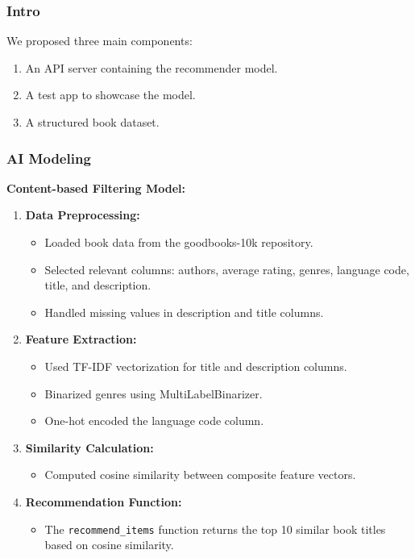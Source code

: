 \documentclass{article}
\begin{document}
\subsubsection{Intro}

We proposed three main components:
\begin{enumerate}
    \item An API server containing the recommender model.
    \item A test app to showcase the model.
    \item A structured book dataset.
\end{enumerate}

\subsubsection{AI Modeling}

\textbf{Content-based Filtering Model:}
\begin{enumerate}
    \item \textbf{Data Preprocessing:}
    \begin{itemize}
        \item Loaded book data from the goodbooks-10k repository.
        \item Selected relevant columns: authors, average rating, genres, language code, title, and description.
        \item Handled missing values in description and title columns.
    \end{itemize}
    \item \textbf{Feature Extraction:}
    \begin{itemize}
        \item Used TF-IDF vectorization for title and description columns.
        \item Binarized genres using MultiLabelBinarizer.
        \item One-hot encoded the language code column.
    \end{itemize}
    \item \textbf{Similarity Calculation:}
    \begin{itemize}
        \item Computed cosine similarity between composite feature vectors.
    \end{itemize}
    \item \textbf{Recommendation Function:}
    \begin{itemize}
        \item The \texttt{recommend\_items} function returns the top 10 similar book titles based on cosine similarity.
    \end{itemize}
\end{enumerate}
\end{document}
